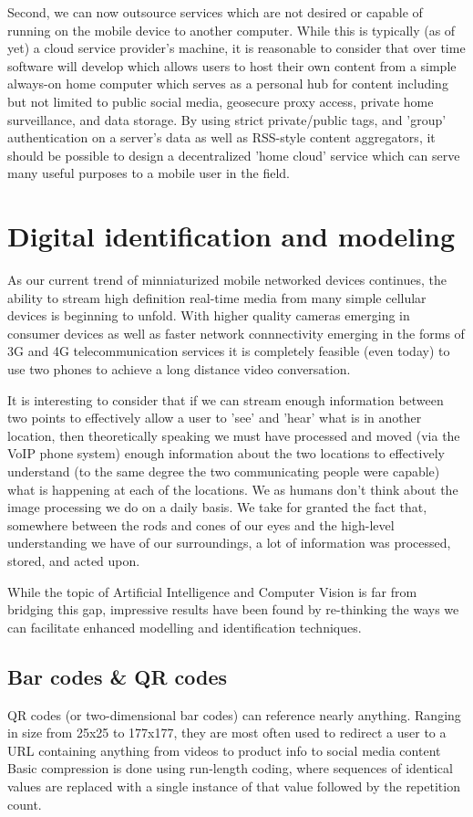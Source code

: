 \documentclass[a4paper,12pt]{report}
\begin{document}
Second, we can now outsource services which are not desired or capable of running on the mobile device to another computer. While this is typically (as of yet) a cloud service provider's machine, it is reasonable to consider that over time software will develop which allows users to host their own content from a simple always-on home computer which serves as a personal hub for content including but not limited to public social media, geosecure proxy access, private home surveillance, and data storage. By using strict private/public tags, and 'group' authentication on a server's data as well as RSS-style content aggregators, it should be possible to design a decentralized 'home cloud' service which can serve many useful purposes to a mobile user in the field.

\section{Digital identification and modeling}

As our current trend of minniaturized mobile networked devices continues, the ability to stream high definition real-time media from many simple cellular devices is beginning to unfold. With higher quality cameras emerging in consumer devices as well as faster network connnectivity emerging in the forms of 3G and 4G telecommunication services it is completely feasible (even today) to use two phones to achieve a long distance video conversation.

It is interesting to consider that if we can stream enough information between two points to effectively allow a user to 'see' and 'hear' what is in another location, then theoretically speaking we must have processed and moved (via the VoIP phone system) enough information about the two locations to effectively understand (to the same degree the two communicating people were capable) what is happening at each of the locations. We as humans don't think about the image processing we do on a daily basis. We take for granted the fact that, somewhere between the rods and cones of our eyes and the high-level understanding we have of our surroundings, a lot of information was processed, stored, and acted upon.

While the topic of Artificial Intelligence and Computer Vision is far from bridging this gap, impressive results have been found by re-thinking the ways we can facilitate enhanced modelling and identification techniques.

\subsection{Bar codes \& QR codes}
QR codes (or two-dimensional bar codes) can reference nearly anything. Ranging in size from 25x25 to 177x177, they are most often used to redirect a user to a URL containing anything from videos to product info to social media content \cite{6182398}
Basic compression is done using run-length coding, where sequences of identical values are replaced with a single instance of that value followed by the repetition count. \cite{6182398}
\end{document}
